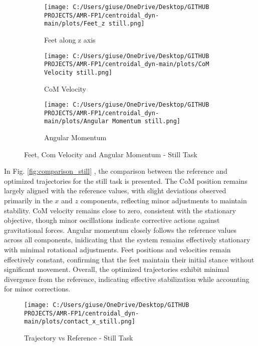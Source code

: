 \documentclass[main.tex]{subfiles}
\begin{document}
\begin{sloppypar}
\begin{figure}[htbp]
    \centering
    \begin{subfigure}[b]{0.32\textwidth}
        \centering
        \texttt{[image: C:/Users/giuse/OneDrive/Desktop/GITHUB PROJECTS/AMR-FP1/centroidal\_dyn-main/plots/Feet\_z still.png]}
        \caption{Feet along z axis}
        \label{fig:feet_z_still}
    \end{subfigure}
    \hfill
    \begin{subfigure}[b]{0.32\textwidth}
        \centering
        \texttt{[image: C:/Users/giuse/OneDrive/Desktop/GITHUB PROJECTS/AMR-FP1/centroidal\_dyn-main/plots/CoM Velocity still.png]}
        \caption{CoM Velocity}
        \label{fig:com_velocity_still}
    \end{subfigure}
    \hfill
    \begin{subfigure}[b]{0.32\textwidth}
        \centering
        \texttt{[image: C:/Users/giuse/OneDrive/Desktop/GITHUB PROJECTS/AMR-FP1/centroidal\_dyn-main/plots/Angular Momentum still.png]}
        \caption{Angular Momentum}
        \label{fig:angular_momentum_still}
    \end{subfigure}
    \caption{Feet, Com Velocity and Angular Momentum - Still Task}
    \label{fig:three_still}
\end{figure}
\newpage
In Fig. \ref{fig:comparison_still} , the comparison between the reference and optimized trajectories for the still task is presented. The CoM position remains largely aligned with the reference values, with slight deviations observed primarily in the $x$ and $z$ components, reflecting minor adjustments to maintain stability. CoM velocity remains close to zero, consistent with the stationary objective, though minor oscillations indicate corrective actions against gravitational forces. Angular momentum closely follows the reference values across all components, inidicating that the system remains effectively stationary with minimal rotational adjustments. Feet positions and velocities remain effectively constant, confirming that the feet maintain their initial stance without significant movement. Overall, the optimized trajectories exhibit minimal divergence from the reference, indicating effective stabilization while accounting for minor corrections.
\begin{figure}[htbp]
    \centering
    \texttt{[image: C:/Users/giuse/OneDrive/Desktop/GITHUB PROJECTS/AMR-FP1/centroidal\_dyn-main/plots/contact\_x\_still.png]}
    \caption{Trajectory vs Reference - Still Task}

\end{figure}
\end{sloppypar}
\end{document}
